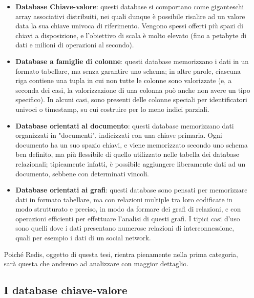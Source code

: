 \begin{itemize}
	\medskip
	\item
	\textbf{Database Chiave-valore}: questi database si comportano come giganteschi array
	associativi distribuiti, nei quali dunque è possibile risalire ad un valore data la
	sua chiave univoca di riferimento. Vengono spessi offerti più spazi di chiavi
	a disposizione, e l'obiettivo di scala è molto elevato (fino a petabyte di dati
	e milioni di operazioni al secondo).

	\item
	\textbf{Database a famiglie di colonne}: questi database memorizzano i dati in un formato
	tabellare, ma senza garantire uno schema; in altre parole, ciascuna riga contiene
	una tupla in cui non tutte le colonne sono valorizzate (e, a seconda dei casi, la
	valorizzazione di una colonna può anche non avere un tipo specifico). In alcuni
	casi, sono presenti delle colonne speciali per identificatori univoci o timestamp,
	su cui costruire per lo meno indici parziali.

	\item
	\textbf{Database orientati al documento}: questi database memorizzano dati organizzati in
	"documenti", indicizzati con una chiave primaria. Ogni documento ha un suo spazio
	chiavi, e viene memorizzato secondo uno schema ben definito, ma più flessibile
	di quello utilizzato nelle tabella dei database relazionali; tipicamente infatti,
	è possibile aggiungere liberamente dati ad un documento, sebbene con determinati
	vincoli.

	\item
	\textbf{Database orientati ai grafi}: questi database sono pensati per memorizzare dati
	in formato tabellare, ma con relazioni multiple tra loro codificate in modo
	strutturato e preciso, in modo da formare dei grafi di relazioni, e con operazioni
	efficienti per effettuare l'analisi di questi grafi. I tipici casi d'uso sono
	quelli dove i dati presentano numerose relazioni di interconnessione, quali per
	esempio i dati di un social network.
\end{itemize}

Poiché Redis, oggetto di questa tesi, rientra pienamente nella prima categoria, sarà
questa che andremo ad analizzare con maggior dettaglio.


\subsection{I database chiave-valore}

